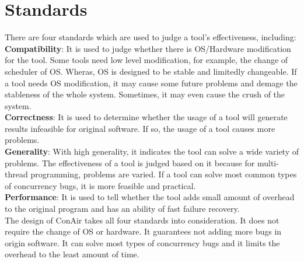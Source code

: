 \section{Standards}
There are four standards which are used to judge a tool's effectiveness, including:\\
\textbf{Compatibility}: It is used to judge whether there is OS/Hardware modification for the tool. Some tools need low level modification, for example, the change of scheduler of OS. Wheras, OS is designed to be stable and limitedly changeable. If a tool needs OS modification, it may cause some future problems and demage the stableness of the whole system. Sometimes, it may even cause the crush of the system.\\
\textbf{Correctness}: It is used to determine whether the usage of a tool will generate results infeasible for original software. If so, the usage of a tool causes more problems.\\
\textbf{Generality}: With high generality, it indicates the tool can solve a wide variety of problems. The effectiveness of a tool is judged based on it because for multi-thread programming, problems are varied. If a tool can solve most common types of concurrency bugs, it is more feasible and practical.\\
\textbf{Performance}: It is used to tell whether the tool adds small amount of overhead to the original program and has an ability of fast failure recovery. \\
The design of ConAir takes all four standards into consideration. It does not require the change of OS or hardware. It guarantees not adding more bugs in origin software. It can solve most types of concurrency bugs and it limits the overhead to the least amount of time. 
